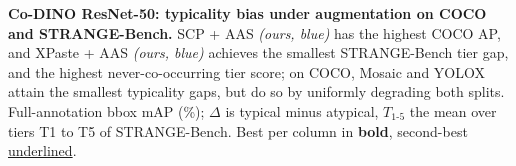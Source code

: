 \begin{table}[t]
\centering
\small
\caption{\textbf{Co-DINO ResNet-50: typicality bias under augmentation
on COCO and STRANGE-Bench.} SCP + AAS \emph{(ours, blue)} has the highest COCO AP, and XPaste + AAS \emph{(ours, blue)} achieves
the smallest STRANGE-Bench tier gap, and the
highest never-co-occurring tier score; on COCO, Mosaic and YOLOX
attain the smallest typicality gaps, but do so by uniformly degrading both splits. Full-annotation bbox mAP (\%); $\Delta$ is typical minus atypical, $T_{1\text{-}5}$ the mean over tiers T1 to T5 of STRANGE-Bench. Best per column in \textbf{bold}, second-best \underline{underlined}.}
\vspace{-2pt}
\label{tab:codino_main}

\vspace{-8pt}
\end{table}
